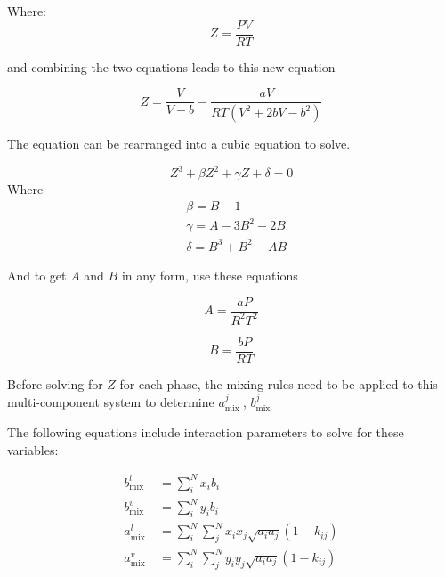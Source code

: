 Where:
\begin{equation}
Z=\frac{P V}{R T}
\end{equation}

and combining the two equations leads to this new equation

\begin{equation}
Z=\frac{V}{V-b}-\frac{a V}{R T\left(V^2+2 b V-b^2\right)}
\end{equation}

The equation can be rearranged into a cubic equation to solve.

\begin{equation}
Z^3+\beta Z^2+\gamma Z+\delta=0
\end{equation}
Where
$$
\begin{aligned}
& \beta=B-1 \\
& \gamma=A-3 B^2-2 B \\
& \delta=B^3+B^2-A B
\end{aligned}
$$

And to get $A$ and $B$ in any form, use these equations

\begin{equation}
A=\frac{a P}{R^2 T^2}
\end{equation}

\begin{equation}
B=\frac{b P}{R T}
\end{equation}

Before solving for $Z$ for each phase, the mixing rules need to be applied to this multi-component system to determine $a_{\text {mix }}^j$, $b_{\text {mix }}^j$

The following equations include interaction parameters to solve for these variables:


\begin{align}
b_{\text {mix }}^l&=\sum_i^N x_i b_i  \\
b_{\text {mix }}^v&=\sum_i^N y_i b_i \\
a_{\text {mix }}^l&=\sum_i^N \sum_j^N x_i x_j \sqrt{a_i a_j}\left(1-k_{i j}\right) \\
a_{\text {mix }}^v&=\sum_i^N \sum_j^N y_i y_j \sqrt{a_i a_j}\left(1-k_{i j}\right)
\end{align}